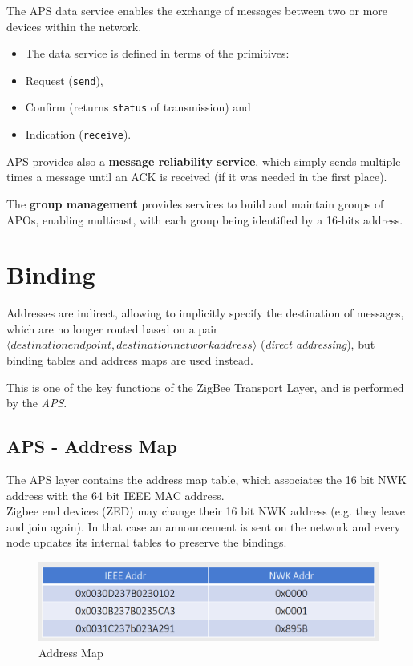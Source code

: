 The APS data service enables the exchange of messages between two or more devices within the network.
\begin{itemize}
   \item The data service is defined in terms of the primitives:
   \item Request (\texttt{send}),
   \item Confirm (returns \texttt{status} of transmission) and
   \item Indication (\texttt{receive}).
\end{itemize}

APS provides also a \textbf{message reliability service}, which simply sends multiple times a message until an ACK is received (if it was needed in the first place).

The \textbf{group management} provides services to build and maintain groups of APOs, enabling multicast, with each group being identified by a 16-bits address.




\section{Binding}
Addresses are indirect, allowing to implicitly specify the destination of messages, which are no longer routed based on a pair $\langle destination endpoint, destination network address \rangle$ (\textit{direct addressing}), but binding tables and address maps are used instead.

This is one of the key functions of the ZigBee Transport Layer, and is performed by the \textit{APS}.

\subsection{APS - Address Map}
The APS layer contains the address map table, which associates the 16 bit NWK address with the 64 bit IEEE
MAC address.\\
Zigbee end devices (ZED) may change their 16 bit NWK
address (e.g. they leave and join again). In that case an
announcement is sent on the network and every node
updates its internal tables to preserve the bindings.
\begin{figure}[htbp]
   \centering
   \includegraphics{images/zigbee_addressmap.png}
   \caption{Address Map}
   \label{fig:zigbee_addressmap}
\end{figure}

